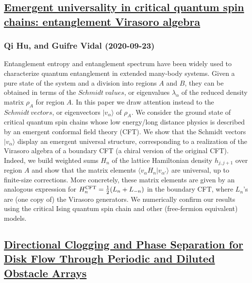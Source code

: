 \subsection*{\href{http://arxiv.org/abs/2009.11383v1}{Emergent universality in critical quantum spin chains: entanglement  Virasoro algebra}}
\subsubsection*{Qi Hu, and Guifre Vidal (2020-09-23)}
Entanglement entropy and entanglement spectrum have been widely used to
characterize quantum entanglement in extended many-body systems. Given a pure
state of the system and a division into regions $A$ and $B$, they can be
obtained in terms of the $Schmidt~ values$, or eigenvalues $\lambda_{\alpha}$
of the reduced density matrix $\rho_A$ for region $A$. In this paper we draw
attention instead to the $Schmidt~ vectors$, or eigenvectors
$|v_{\alpha}\rangle$ of $\rho_A$. We consider the ground state of critical
quantum spin chains whose low energy/long distance physics is described by an
emergent conformal field theory (CFT). We show that the Schmidt vectors
$|v_{\alpha}\rangle$ display an emergent universal structure, corresponding to
a realization of the Virasoro algebra of a boundary CFT (a chiral version of
the original CFT). Indeed, we build weighted sums $H_n$ of the lattice
Hamiltonian density $h_{j,j+1}$ over region $A$ and show that the matrix
elements $\langle v_{\alpha}H_n |v_{\alpha'}\rangle$ are universal, up to
finite-size corrections. More concretely, these matrix elements are given by an
analogous expression for $H_n^{\tiny \text{CFT}} = \frac 1 2 (L_n + L_{-n})$ in
the boundary CFT, where $L_n$'s are (one copy of) the Virasoro generators. We
numerically confirm our results using the critical Ising quantum spin chain and
other (free-fermion equivalent) models.

\subsection*{\href{http://arxiv.org/abs/2009.11372v1}{Directional Clogging and Phase Separation for Disk Flow Through Periodic  and Diluted Obstacle Arrays}}
